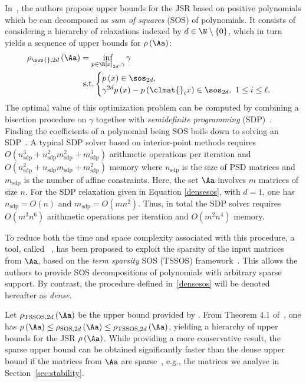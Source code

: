 In~\cite{parrilo}, the authors propose upper bounds for the JSR based on positive polynomials which be can decomposed as \emph{sum of squares} (SOS) of polynomials.
%
It consists of considering a hierarchy of relaxations indexed by $d\in\N\setminus \left\{ 0 \right\}$, which in turn yields a sequence of upper bounds for $\rho\left(\Aa\right)$:
\begin{align}
    \label{densesos}
    \rho_{\sos{},2d}\left(\Aa\right) &= \inf_{p\in\R\left[x\right]_{2d},\gamma}  \gamma \\
    &\textrm{ s.t.} 
    \begin{cases} 
        p\left(x\right)\in\sos_{2d},\\
        \gamma^{2d}p\left(x\right)-p\left(\clmat{}_ix\right)\in\sos_{2d},\ 1 \leq i \leq \ell.
    \end{cases} \nonumber
\end{align}
%
The optimal value of this optimization problem can be computed by combining a bisection procedure on $\gamma$ together with \emph{semidefinite programming} (SDP)~\cite{wolkowicz2012handbook}.
Finding the coefficients of a polynomial being SOS boils down to solving an SDP~\cite{re2, parrilo2000structured, lasserre2001global}.
A typical SDP solver based on interior-point methods requires $O(n_{\text{sdp}}^3 + n_{\text{sdp}}^2 m_{\text{sdp}}^2 + m_{\text{sdp}}^3)$ arithmetic operations per iteration and $O(n_{\text{sdp}}^2 + n_{\text{sdp}} m_{\text{sdp}} + m_{\text{sdp}}^2)$ memory where $n_{\text{sdp}}$ is the size of PSD matrices and $m_{\text{sdp}}$ is the number of affine constraints.
Here, the set $\Aa$ involves $m$ matrices of size $n$.
For the SDP relaxation given in Equation \eqref{densesos}, with $d = 1$, one has $n_{\text{sdp}} = O(n)$ and $m_{\text{sdp}} = O(m n^2)$.
Thus, in total the SDP solver requires $O(m^3 n^6)$ arithmetic operations per iteration and $O(m^2 n^4)$ memory.

To reduce both the time and space complexity associated with this procedure, a tool, called ~\cite{sparsejsr}, has been proposed to exploit the sparsity of the input matrices from $\Aa$, based on the \emph{term sparsity} SOS (TSSOS) framework~\cite{tssos}.
This allows the authors to provide SOS decompositions of polynomials with arbitrary sparse support.
By contrast, the procedure defined in~\eqref{densesos} will be denoted hereafter as \emph{dense}.

Let $\rho_{\textrm{TSSOS},2d}\left(\Aa\right)$ be the upper bound provided by .
From Theorem 4.1 of~\cite{sparsejsr}, one has $\rho\left(\Aa\right) \leq \rho_{\textrm{SOS},2d}\left(\Aa\right) \leq \rho_{\textrm{TSSOS},2d}\left(\Aa\right)$, yielding a hierarchy of upper bounds for the JSR $\rho\left(\Aa\right)$.
While providing a more conservative result, the sparse upper bound can be obtained significantly faster than the dense upper bound if the matrices from $\Aa$ are sparse~\cite{sparsejsr}, e.g., the matrices we analyse in Section~\ref{sec:stability}.
